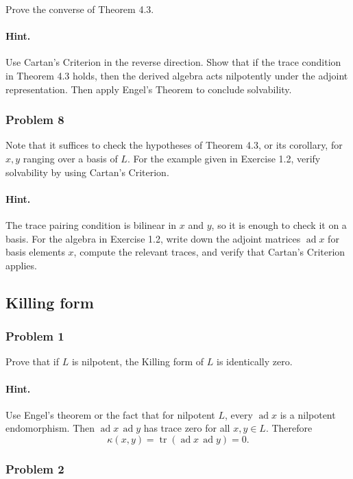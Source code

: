 \documentclass[12pt, a4paper]{article}
\begin{document}
Prove the converse of Theorem 4.3.

\paragraph{Hint.}
Use Cartan's Criterion in the reverse direction. Show that if the trace
condition in Theorem 4.3 holds, then the derived algebra acts nilpotently under
the adjoint representation. Then apply Engel's Theorem to conclude solvability.

\subsubsection{Problem 8}

Note that it suffices to check the hypotheses of Theorem 4.3, or its corollary,
for \(x,y\) ranging over a basis of \(L\). For the example given in Exercise
1.2, verify solvability by using Cartan's Criterion.

\paragraph{Hint.}
The trace pairing condition is bilinear in \(x\) and \(y\), so it is enough to
check it on a basis. For the algebra in Exercise 1.2, write down the adjoint
matrices \(\operatorname{ad}x\) for basis elements \(x\), compute the relevant
traces, and verify that Cartan's Criterion applies.

\subsection{Killing form}
\subsubsection{Problem 1}

Prove that if \(L\) is nilpotent, the Killing form of \(L\) is identically
zero.

\paragraph{Hint.}
Use Engel's theorem or the fact that for nilpotent \(L\), every
\(\operatorname{ad}x\) is a nilpotent endomorphism. Then
\(\operatorname{ad}x\,\operatorname{ad}y\) has trace zero for all \(x,y\in L\).
Therefore
\[
\kappa(x,y)=\operatorname{tr}(\operatorname{ad}x\,\operatorname{ad}y)=0.
\]

\subsubsection{Problem 2}
\end{document}
